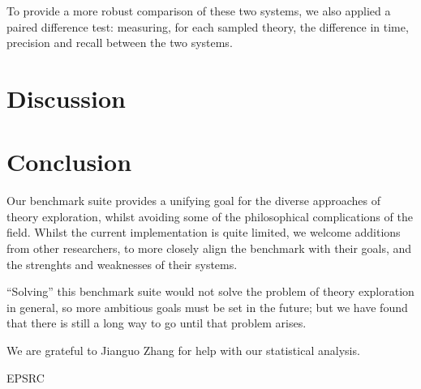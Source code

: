 To provide a more robust comparison of these two systems, we also applied a
paired difference test: measuring, for each sampled theory, the difference in
time, precision and recall between the two systems.

\section{Discussion}
\label{section:application}


\section{Conclusion}
\label{section:conclusion}


Our benchmark suite provides a unifying goal for the diverse approaches of
theory exploration, whilst avoiding some of the philosophical complications of
the field. Whilst the current implementation is quite limited, we welcome
additions from other researchers, to more closely align the benchmark with their
goals, and the strenghts and weaknesses of their systems.

``Solving'' this benchmark suite would not solve the problem of theory exploration in general,
so more ambitious goals must be set in the future; but we have found that there is still a
long way to go until that problem arises.

\begin{acknowledgements}
  We are grateful to Jianguo Zhang for help with our statistical analysis.

  EPSRC
\end{acknowledgements}





